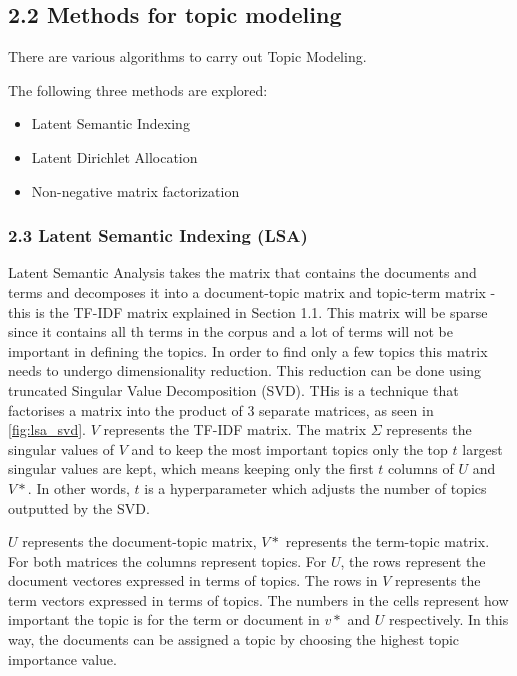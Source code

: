 \documentclass[
]{article}
\providecommand{\tightlist}{%
  \setlength{\itemsep}{0pt}\setlength{\parskip}{0pt}}
\begin{document}
\hypertarget{methods-for-topic-modeling}{%
\subsection{2.2 Methods for topic
modeling}\label{methods-for-topic-modeling}}

There are various algorithms to carry out Topic Modeling.

The following three methods are explored:

\begin{itemize}
\tightlist
\item
  Latent Semantic Indexing
\item
  Latent Dirichlet Allocation
\item
  Non-negative matrix factorization
\end{itemize}

\hypertarget{latent-semantic-indexing-lsa}{%
\subsubsection{2.3 Latent Semantic Indexing
(LSA)}\label{latent-semantic-indexing-lsa}}

Latent Semantic Analysis takes the matrix that contains the documents
and terms and decomposes it into a document-topic matrix and topic-term
matrix - this is the TF-IDF matrix explained in Section 1.1. This matrix
will be sparse since it contains all th terms in the corpus and a lot of
terms will not be important in defining the topics. In order to find
only a few topics this matrix needs to undergo dimensionality reduction.
This reduction can be done using truncated Singular Value Decomposition
(SVD). THis is a technique that factorises a matrix into the product of
3 separate matrices, as seen in \ref{fig:lsa_svd}. \(V\) represents the
TF-IDF matrix. The matrix \(\Sigma\) represents the singular values of
\(V\) and to keep the most important topics only the top \(t\) largest
singular values are kept, which means keeping only the first \(t\)
columns of \(U\) and \(V*\). In other words, \(t\) is a hyperparameter
which adjusts the number of topics outputted by the SVD.

\(U\) represents the document-topic matrix, \(V*\) represents the
term-topic matrix. For both matrices the columns represent topics. For
\(U\), the rows represent the document vectores expressed in terms of
topics. The rows in \(V\) represents the term vectors expressed in terms
of topics. The numbers in the cells represent how important the topic is
for the term or document in \(v*\) and \(U\) respectively. In this way,
the documents can be assigned a topic by choosing the highest topic
importance value.
\end{document}
